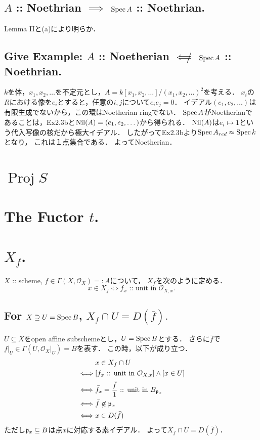 \documentclass[a4paper]{jsarticle}
\newcommand{\shO}{\mathcal{O}}
\newcommand{\Proj}{\operatorname{Proj}}
\begin{document}
    \subsection{$A$ :: Noethrian $\implies$ $\operatorname{Spec} A$ :: Noethrian.}
    Lemma IIと(a)により明らか．

    \subsection{Give Example: $A$ :: Noetherian $\not \impliedby$ $\operatorname{Spec} A$ :: Noethrian.}
    $k$を体，$x_1,x_2,\dots$を不定元とし，$A=k[x_1,x_2,\dots]/(x_1,x_2,\dots)^2$を考える．
    $x_i$の$R$における像を$e_i$とすると，任意の$i,j$について$e_i e_j=0$．
    イデアル$(e_1,e_2,\dots)$は有限生成でないから，この環はNoetherian ringでない．
    $\operatorname{Spec} A$がNoetherianであることは，Ex2.3bと$\operatorname{Nil}(A)=(e_1,e_2,\dots)$から得られる．
    $\operatorname{Nil}(A)$は$e_i \mapsto 1$という代入写像の核だから極大イデアル．
    したがってEx2.3bより$\operatorname{Spec} A_{red} \approx \operatorname{Spec} k$となり，
    これは１点集合である．
    よってNoetherian．

\section{$\Proj S$} %

\section{The Fuctor $t$.} %

\section{$X_f$.} %
    $X$ :: scheme, $f \in \Gamma(X, \shO_X)=:A$について，
    $X_f$を次のように定める．
    \[ x \in X_f \iff f_x \text{ :: unit in }\shO_{X,x}. \]

    \subsection{For $X \supseteq U=\operatorname{Spec} B$, $X_f \cap U=D(\bar{f}).$}
    $U \subseteq X$をopen affine subschemeとし，$U=\operatorname{Spec} B$とする．
    さらに$\bar{f}$で$f|_{U} \in \Gamma(U,\shO_X|_U)=B$を表す．
    この時，以下が成り立つ．
    \begin{align*}
        {}&     x \in X_f \cap U \\
        \iff&   [ f_x \text{ :: unit in }\shO_{X,x}] \land [x \in U] \\
        \iff&   \bar{f}_x=\frac{\bar{f}}{1} \text{ :: unit in }B_{\I{p}_x} \\
        \iff&   \bar{f} \not\in \I{p}_x \\
        \iff&   x \in D(\bar{f})
    \end{align*}
    ただし$\mathfrak{p}_x \subseteq B$は点$x$に対応する素イデアル．
    よって$X_f \cap U=D(\bar{f})$．
\end{document}

